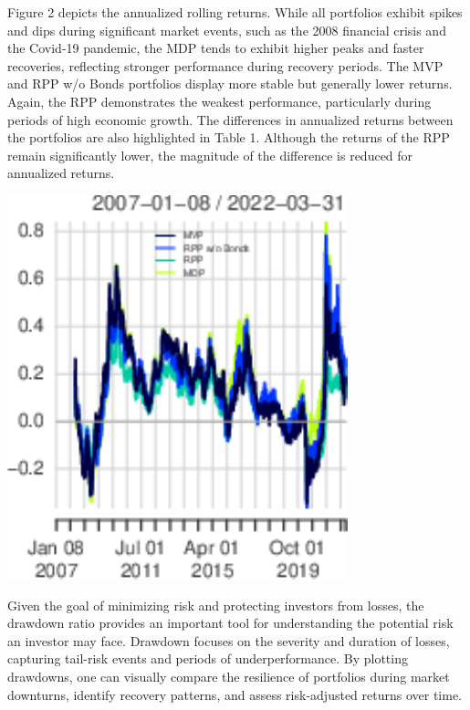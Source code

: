 \documentclass[11pt,preprint]{elsarticle}
\let\origfigure\figure
\let\endorigfigure\endfigure
\renewenvironment{figure}[1][2] {
    \expandafter\origfigure\expandafter[H]
} {
    \endorigfigure
}
\numberwithin{equation}{section}
\numberwithin{figure}{section}
\numberwithin{table}{section}
\begin{document}
Figure 2 depicts the annualized rolling returns. While all portfolios
exhibit spikes and dips during significant market events, such as the
2008 financial crisis and the Covid-19 pandemic, the MDP tends to
exhibit higher peaks and faster recoveries, reflecting stronger
performance during recovery periods. The MVP and RPP w/o Bonds
portfolios display more stable but generally lower returns. Again, the
RPP demonstrates the weakest performance, particularly during periods of
high economic growth. The differences in annualized returns between the
portfolios are also highlighted in Table 1. Although the returns of the
RPP remain significantly lower, the magnitude of the difference is
reduced for annualized returns.

\begin{figure}[H]

{\centering \includegraphics{Essay_files/figure-latex/Figure2-1} 

}

\caption{Annualized rolling returns \label{Figure2}}\label{fig:Figure2}
\end{figure}

Given the goal of minimizing risk and protecting investors from losses,
the drawdown ratio provides an important tool for understanding the
potential risk an investor may face. Drawdown focuses on the severity
and duration of losses, capturing tail-risk events and periods of
underperformance. By plotting drawdowns, one can visually compare the
resilience of portfolios during market downturns, identify recovery
patterns, and assess risk-adjusted returns over time.
\end{document}
